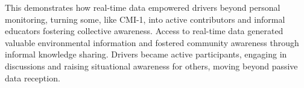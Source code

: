 
This demonstrates how real-time data empowered drivers beyond personal monitoring, turning some, like CMI-1, into active contributors and informal educators fostering collective awareness.
Access to real-time data generated valuable environmental information and fostered community awareness through informal knowledge sharing.
Drivers became active participants, engaging in discussions and raising situational awareness for others, moving beyond passive data reception.











